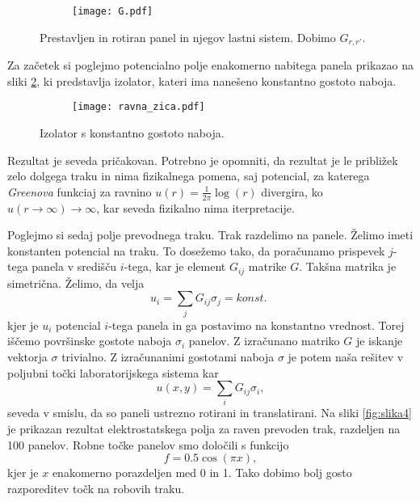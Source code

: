 \documentclass[12pt,a4paper]{article}
\begin{document}
\begin{figure}[H]
    \centering
    \begin{subfigure}[b]{\textwidth}  			
        \texttt{[image: G.pdf]}
    \end{subfigure}
    \caption{Prestavljen in rotiran panel in njegov lastni sistem. Dobimo $G_{r,r'}$.} \label{fig:slika2}
\end{figure}

Za začetek si poglejmo potencialno polje enakomerno nabitega panela prikazao na sliki \ref{fig:slika3}, ki predstavlja izolator, kateri ima nanešeno konstantno gostoto naboja.

\begin{figure}[H]
    \centering
    \begin{subfigure}[b]{0.5\textwidth}  			
        \texttt{[image: ravna\_zica.pdf]}
    \end{subfigure}
    \caption{Izolator s konstantno gostoto naboja.} \label{fig:slika3}
\end{figure}

\noindent Rezultat je seveda pričakovan. Potrebno je opomniti, da rezultat je le približek zelo dolgega traku in nima fizikalnega pomena, saj potencial, za katerega \textit{Greenova} funkciaj za ravnino $u(r)= \frac{1}{2\pi}\log(r)$ divergira, ko $u(r \rightarrow \infty)  \rightarrow 
\infty$, kar seveda fizikalno nima iterpretacije.

Poglejmo si sedaj polje prevodnega traku. Trak razdelimo na panele. Želimo imeti konstanten potencial na traku. To dosežemo tako, da  poračunamo prispevek $j$-tega panela v središču $i$-tega, kar je element $G_{ij}$ matrike $G$. Takšna matrika je simetrična. Želimo, da velja
\begin{equation}
u_i = \sum_j G_{ij} \sigma _j = konst. \ \,
\end{equation}
kjer je $u_i$ potencial $i$-tega panela in ga postavimo na konstantno vrednost. Torej iščemo površinske gostote naboja $\sigma _i$ panelov. Z izračunano matriko $G$ je iskanje vektorja $\sigma$ trivialno. Z izračunanimi gostotami naboja $\sigma$ je potem naša rešitev v poljubni točki laboratorijskega sistema kar
\begin{equation*}
u(x,y)= \sum _i G_{ij} \sigma _i,
\end{equation*}
seveda v smislu, da so paneli ustrezno rotirani in translatirani.
Na sliki \ref{fig:slika4} je prikazan rezultat elektrostatskega polja za raven prevoden trak, razdeljen na 100 panelov. Robne točke panelov smo določili s funkcijo
\begin{equation*}
f=0.5 \cos (\pi x),
\end{equation*}
kjer je $x$ enakomerno porazdeljen med 0 in 1. Tako dobimo bolj gosto razporeditev točk na robovih traku.
\end{document}
